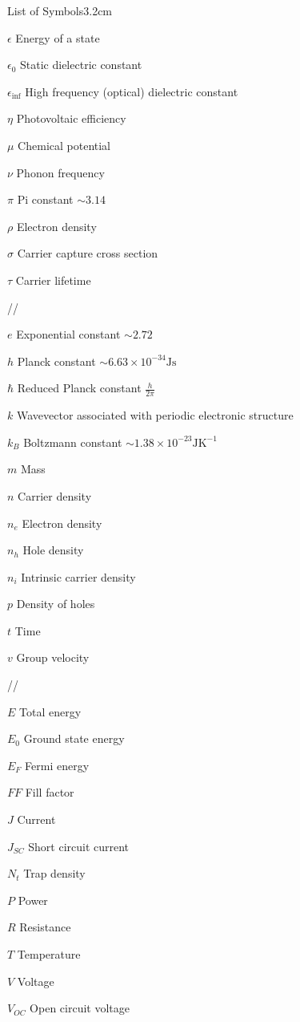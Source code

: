 \begin{mclistof}{List of Symbols}{3.2cm}

\item[$\epsilon$] Energy of a state
\item[$\epsilon_0$] Static dielectric constant
\item[$\epsilon_{\inf}$] High frequency (optical) dielectric constant 
\item[$\eta$] Photovoltaic efficiency
\item[$\mu$] Chemical potential
\item[$\nu$] Phonon frequency
\item[$\pi$] Pi constant $\sim 3.14$
\item[$\rho$] Electron density
\item[$\sigma$] Carrier capture cross section
\item[$\tau$] Carrier lifetime

//

\item[$e$] Exponential constant $\sim 2.72$
\item[$h$] Planck constant $\sim 6.63\times10^{-34}\textrm{Js}$
\item[$\hbar$] Reduced Planck constant $\frac{h}{2\pi}$ 
\item[$k$] Wavevector associated with periodic electronic structure
\item[$k_B$] Boltzmann constant $\sim 1.38\times10^{-23}\textrm{JK}^{-1}$
\item[$m$] Mass   %
\item[$n$] Carrier density
\item[$n_e$] Electron density
\item[$n_h$] Hole density
\item[$n_i$] Intrinsic carrier density
\item[$p$] Density of holes
\item[$t$] Time
\item[$v$] Group velocity

//

\item[$E$] Total energy
\item[$E_0$] Ground state energy
\item[$E_F$] Fermi energy
\item[$FF$] Fill factor
\item[$J$] Current
\item[$J_{SC}$] Short circuit current
\item[$N_t$] Trap density
\item[$P$] Power
\item[$R$] Resistance
\item[$T$] Temperature
\item[$V$] Voltage
\item[$V_{OC}$] Open circuit voltage


\end{mclistof} 